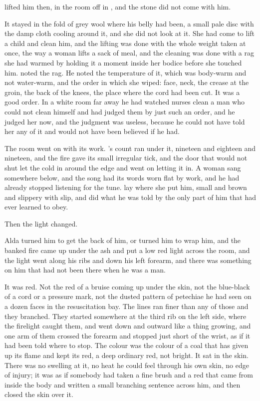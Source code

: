  lifted him then, in the room off  in , and the stone did not come with him.

It stayed in the fold of grey wool where his belly had been, a small pale disc with the damp cloth cooling around it, and she did not look at it. She had come to lift a child and clean him, and the lifting was done with the whole weight taken at once, the way a woman lifts a sack of meal, and the cleaning was done with a rag she had warmed by holding it a moment inside her bodice before she touched him.  noted the rag. He noted the temperature of it, which was body-warm and not water-warm, and the order in which she wiped: face, neck, the crease at the groin, the back of the knees, the place where the cord had been cut. It was a good order. In a white room far away he had watched nurses clean a man who could not clean himself and had judged them by just such an order, and he judged her now, and the judgment was useless, because he could not have told her any of it and would not have been believed if he had.

The room went on with its work. 's count ran under it, nineteen and eighteen and nineteen, and the fire gave its small irregular tick, and the door that would not shut let the cold in around the edge and went on letting it in. A woman sang somewhere below, and the song had its words worn flat by work, and he had already stopped listening for the tune.  lay where she put him, small and brown and slippery with slip, and did what he was told by the only part of him that had ever learned to obey.

Then the light changed.

Alda turned him to get the back of him, or turned him to wrap him, and the banked fire came up under the ash and put a low red light across the room, and the light went along his ribs and down his left forearm, and there was something on him that had not been there when he was a man.

It was red. Not the red of a bruise coming up under the skin, not the blue-black of a cord or a pressure mark, not the dusted pattern of petechiae he had seen on a dozen faces in the resuscitation bay. The lines ran finer than any of those and they branched. They started somewhere at the third rib on the left side, where the firelight caught them, and went down and outward like a thing growing, and one arm of them crossed the forearm and stopped just short of the wrist, as if it had been told where to stop. The colour was the colour of a coal that has given up its flame and kept its red, a deep ordinary red, not bright. It sat in the skin. There was no swelling at it, no heat he could feel through his own skin, no edge of injury; it was as if somebody had taken a fine brush and a red that came from inside the body and written a small branching sentence across him, and then closed the skin over it.

